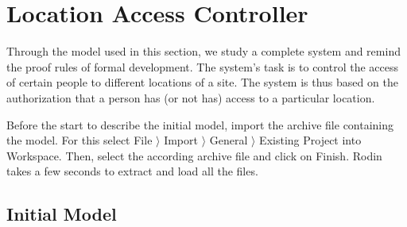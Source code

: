 \section{Location Access Controller}
\label{tutorial_10}



Through the model used in this section, we study a complete system and remind the proof rules of formal development. The system's task is to control the access of certain people to different locations of a site. The system is thus based on the authorization that a person has (or not has) access to a particular location.

Before the start to describe the initial model, import the archive file  containing the model. For this select  \textsf{File $\rangle$ Import $\rangle$ General $\rangle$ Existing Project into Workspace}. Then, select the according archive file and click on \textsf{Finish}. Rodin takes a few seconds to extract and load all the files.

\subsection{Initial Model}


 

